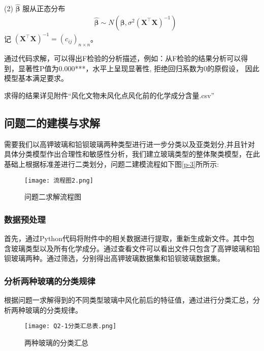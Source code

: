 (2) $\hat{\boldsymbol{\beta}}$ 服从正态分布
\begin{align}
	\quad \hat{\boldsymbol{\beta}} \sim N\left(\boldsymbol{\beta}, \sigma^2\left(\boldsymbol{X}^{\top} \boldsymbol{X}\right)^{-1}\right)
\end{align}
记 $\left(\boldsymbol{X}^{\top} \boldsymbol{X}\right)^{-1}=\left(c_{i j}\right)_{n \times n} $。



通过代码求解，可以得出F检验的分析描述，例如：从F检验的结果分析可以得到，显著性P值为0.000***，水平上呈现显著性, 拒绝回归系数为0的原假设， 因此模型基本满足要求。

求得的结果详见附件``风化文物未风化点风化前的化学成分含量.csv''

\subsection{问题二的建模与求解}
需要我们以高钾玻璃和铅钡玻璃两种类型进行进一步分类以及亚类划分,并且针对具体分类模型作出合理性和敏感性分析，我们建立玻璃类型的整体聚类模型，在此基础上根据标准差进行二类划分，问题二建模流程如下图\ref{p-3}所所示:
\begin{figure}[!htbp]
	\centering
	\texttt{[image: 流程图2.png]}
	\setlength{\abovecaptionskip}{3pt}%
	\caption{问题二求解流程图}
	\label{p-7}
\end{figure}


\subsubsection{数据预处理}
首先，通过Python代码将附件中的相关数据进行提取，重新生成新文件。其中包含玻璃类型以及所有化学成分。通过查看文件可以看出文件只包含了高钾玻璃和铅钡玻璃两种。通过筛选，分别得出高钾玻璃数据集和铅钡玻璃数据集。

\subsubsection{分析两种玻璃的分类规律}
根据问题一求解得到的不同类型玻璃中风化前后的特征值，通过进行分类汇总，分析两种玻璃的分类规律。
\begin{figure}[!htbp]
	\centering
	\texttt{[image: Q2-1分类汇总表.png]}
	\setlength{\abovecaptionskip}{3pt}%
	\caption{两种玻璃的分类汇总}
	\label{p-8}
\end{figure}

